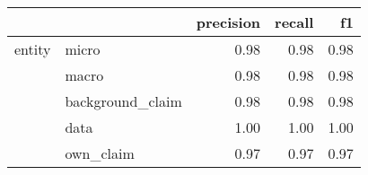 \begin{tabular}{llrrr}
\toprule
       &           &  precision &  recall &   f1 \\
\midrule
entity & micro &       0.98 &    0.98 & 0.98 \\
       & macro &       0.98 &    0.98 & 0.98 \\
       & background\_claim &       0.98 &    0.98 & 0.98 \\
       & data &       1.00 &    1.00 & 1.00 \\
       & own\_claim &       0.97 &    0.97 & 0.97 \\
\bottomrule
\end{tabular}
